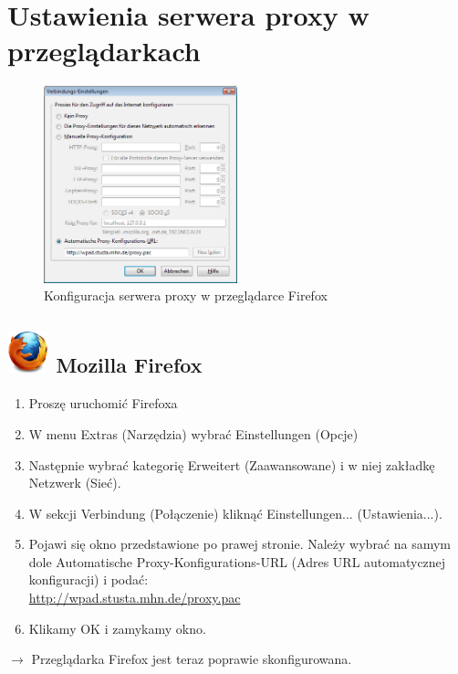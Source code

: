 \documentclass[a4paper,12pt]{scrartcl}
\begin{document}
\newpage

\section*{Ustawienia serwera proxy w przeglądarkach}

\begin{figure}
  \begin{center}
    \includegraphics[width=0.5\textwidth,keepaspectratio]{Bilder/Proxy_Firefox}
  \end{center}
  \caption{Konfiguracja serwera proxy w przeglądarce Firefox}
\end{figure}

\subsection*{\includegraphics[height=1.2cm,keepaspectratio]{Bilder/Firefox_35_logo} Mozilla Firefox}
\begin{enumerate}
    \item Proszę uruchomić Firefoxa
    \item W menu Extras (Narzędzia) wybrać Einstellungen (Opcje)
    \item Następnie wybrać kategorię Erweitert (Zaawansowane) i w niej zakładkę Netzwerk (Sieć).
    \item W sekcji Verbindung (Połączenie) kliknąć Einstellungen... (Ustawienia...).
    \item Pojawi się okno przedstawione po prawej stronie. Należy wybrać na samym dole Automatische Proxy-Konfigurations-URL (Adres URL automatycznej konfiguracji) i podać:\\ \url{http://wpad.stusta.mhn.de/proxy.pac}
    \item Klikamy OK i zamykamy okno.
\end{enumerate}
$\rightarrow$ Przeglądarka Firefox jest teraz poprawie skonfigurowana.
\end{document}
